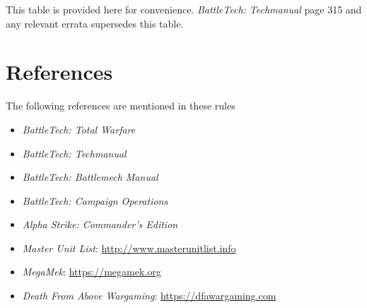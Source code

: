 \documentclass[UTF8]{article}
\begin{document}
This table is provided here for convenience.
\emph{BattleTech: Techmanual} page 315 and any relevant errata supersedes this table.

\newpage

\section{References}

The following references are mentioned in these rules

\begin{itemize}

\item \emph{BattleTech: Total Warfare}

\item \emph{BattleTech: Techmanual}

\item \emph{BattleTech: Battlemech Manual}

\item \emph{BattleTech: Campaign Operations}

\item \emph{Alpha Strike: Commander's Edition}

\item \emph{Master Unit List}: \href{http://www.masterunitlist.info}{http://www.masterunitlist.info}

\item \emph{MegaMek}: \href{https://megamek.org}{https://megamek.org}

\item \emph{Death From Above Wargaming}: \href{https://dfawargaming.com}{https://dfawargaming.com}

\end{itemize}
\end{document}
